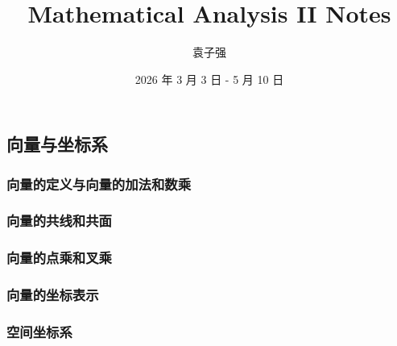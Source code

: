 \documentclass[a4paper,12pt]{article}
\title{\textbf{Mathematical Analysis II Notes}}
\author{袁子强}
\date{2026 年 3 月 3 日 - 5 月 10 日}
\theoremstyle{plain}
\theoremstyle{definition}
\theoremstyle{remark}
\begin{document}
\maketitle

\tableofcontents

\newpage

\setcounter{section}{7} %


\subsection{向量与坐标系}
\subsubsection{向量的定义与向量的加法和数乘}
\subsubsection{向量的共线和共面}
\subsubsection{向量的点乘和叉乘}
\subsubsection{向量的坐标表示}
\subsubsection{空间坐标系}































\end{document}
